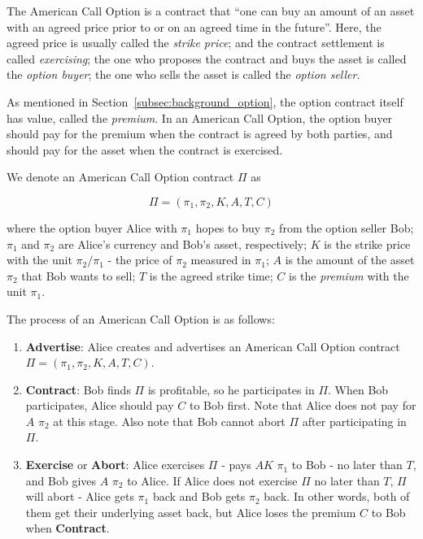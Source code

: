 The American Call Option is a contract that ``one can buy an amount of an asset with an agreed price prior to or on an agreed time in the future''. 
Here,
the agreed price is usually called the \textit{strike price};
and the contract settlement is called \textit{exercising};
the one who proposes the contract and buys the asset is called the \textit{option buyer};
the one who sells the asset is called the \textit{option seller}.

As mentioned in Section~\ref{subsec:background_option}, the option contract itself has value, called the \textit{premium}.
In an American Call Option, the option buyer should pay for the premium when the contract is agreed by both parties, and should pay for the asset when the contract is exercised.

We denote an American Call Option contract $\Pi$ as

$$\Pi = (\pi_1, \pi_2, K, A, T, C)$$

where
the option buyer Alice with $\pi_1$ hopes to buy $\pi_2$ from the option seller Bob;
$\pi_1$ and $\pi_2$ are Alice's currency and Bob's asset, respectively; 
$K$ is the strike price with the unit $\pi_2 / \pi_1$ - the price of $\pi_2$ measured in $\pi_1$;
$A$ is the amount of the asset $\pi_2$ that Bob wants to sell;
$T$ is the agreed strike time;
$C$ is the \textit{premium} with the unit $\pi_1$.

The process of an American Call Option is as follows:

\begin{enumerate}
    \item \textbf{Advertise}: Alice creates and advertises an American Call Option contract $\Pi = (\pi_1, \pi_2, K, A, T, C)$.
    \item \textbf{Contract}: Bob finds $\Pi$ is profitable, so he participates in $\Pi$.
    When Bob participates, Alice should pay $C$ to Bob first.
    Note that Alice does not pay for $A$ $\pi_2$ at this stage.
    Also note that Bob cannot abort $\Pi$ after participating in $\Pi$.
    \item \textbf{Exercise} or \textbf{Abort}: Alice exercises $\Pi$ - pays $AK$ $\pi_1$ to Bob - no later than $T$, and Bob gives $A$ $\pi_2$ to Alice.
    If Alice does not exercise $\Pi$ no later than $T$, $\Pi$ will abort - Alice gets $\pi_1$ back and Bob gets $\pi_2$ back.
    In other words, both of them get their underlying asset back, but Alice loses the premium $C$ to Bob when \textbf{Contract}.
\end{enumerate}












